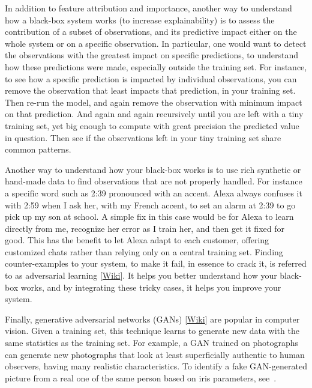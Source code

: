 \documentclass[oneside,10pt]{book}
\begin{document}
In addition to feature attribution and importance, another way to understand how a black-box system works (to increase explainability) is to assess the contribution of
a subset of observations, and its predictive impact either on the whole system or on a specific observation. In particular, one would want to detect the observations with the greatest impact on specific predictions, to understand how these predictions were made, especially outside the training set. For instance, to see how a specific prediction is impacted by individual observations,
you can remove the observation that least impacts that prediction, in your training set. Then re-run the model, and again remove the observation with minimum impact on that prediction.
 And again and again recursively until you are left with a tiny training set, yet big enough to compute with great precision the predicted value in question. Then see if the observations left in your tiny training set share common patterns.

 Another way to understand how your black-box works is to use rich synthetic or hand-made data to find observations that are not properly handled. For instance
 a specific word such as 2:39 pronounced with an accent. Alexa always confuses it with 2:59 when I ask her, with my French accent, to set an alarm at 2:39 to go pick up my son at school. A simple fix in this case would be for Alexa to learn directly from me, recognize her error as I train her, and then get it fixed for good. This has the benefit to let Alexa adapt to each customer, offering customized chats rather than relying only on a central training set. Finding counter-examples to your system, to make it fail, in essence to crack it, is referred to as \textcolor{index}{adversarial learning} [\href{https://en.wikipedia.org/wiki/Adversarial_machine_learning}{Wiki}]. It helps you better understand how your black-box works, and by integrating these tricky cases, it helps you improve your system.

Finally, \textcolor{index}{generative adversarial networks} (GANs) [\href{https://en.wikipedia.org/wiki/Generative_adversarial_network}{Wiki}] are popular in computer vision. Given a training set, this technique learns to generate new data with the same statistics as the training set. For example, a GAN trained on photographs can generate new photographs that look at least superficially authentic to human observers, having many realistic characteristics.
To identify a fake GAN-generated picture from a real one of the same person based on iris parameters, see~\cite{gan2021}.
\end{document}
